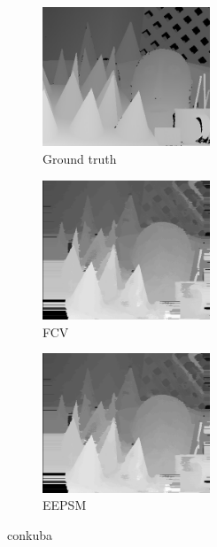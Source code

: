 \begin{figure}[ht]
  \centering
  \begin{subfigure}[t]{0.3\textwidth}
    \centering\includegraphics[width=5cm]{figures/con_gt}
    \caption{Ground truth \cite{Scharstein2003}\label{fig:con_gt}}
  \end{subfigure}\hspace{0.5cm}
  \begin{subfigure}[t]{0.3\textwidth}
    \centering\includegraphics[width=5cm]{figures/con_fcv}
    \caption{FCV\label{fig:con_fcv}}
  \end{subfigure}\hspace{0.5cm}
  \begin{subfigure}[t]{0.3\textwidth}
    \centering\includegraphics[width=5cm]{figures/con_fcv}
    \caption{EEPSM\label{fig:con_eepsm}}
  \end{subfigure}
  \caption{conkuba \label{fig:conall}}
\end{figure}

